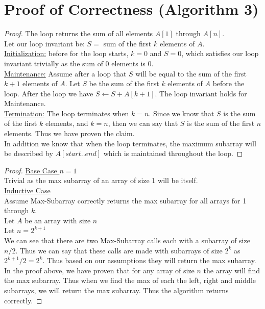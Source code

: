 \documentclass[paper=a4, fontsize=11pt]{scrartcl} %
\numberwithin{equation}{section} %
\numberwithin{figure}{section} %
\numberwithin{table}{section} %
\begin{document}
\section{Proof of Correctness (Algorithm 3)}
\begin{proof}
    The loop returns the sum of all elements $A[1]$ through $A[n]$. \\
    Let our loop invariant be: $S = $ sum of the first $k$ elements of $A$. \\
    \underline{Initialization:} before for the loop starts,
    $k = 0$ and $S = 0$, which satisfies our loop invariant trivially as
    the sum of 0 elements is 0. \\
    \underline{Maintenance:} Assume after a loop that $S$ will be equal to
    the sum of the first $k + 1$ elements of $A$. Let $S$ be the sum of the 
    first $k$ elements of $A$ before the loop. After the loop we have 
    $S \gets S + A[k + 1]$. The loop invariant holds for Maintenance. \\
    \underline{Termination:} The loop terminates when $k = n$. Since we know
    that $S$ is the sum of the first $k$ elements, and $k = n$, then we can 
    say that $S$ is the sum of the first $n$ elements. Thus we have proven the claim. \\
    In addition we know that when the loop terminates, the maximum subarray will
    be described by $A[start..end]$ which is maintained throughout the loop.
\end{proof}
\begin{proof}
    \underline{Base Case $n = 1$} \\
    Trivial as the max subarray of an array of size 1 will be itself. \\
    \underline{Inductive Case} \\
    Assume Max-Subarray correctly returns the max subarray for all arrays
    for 1 through $k$. \\
    Let $A$ be an array with size $n$ \\
    Let $n = 2^{k + 1}$ \\
    We can see that there are two Max-Subarray calls each with a subarray of
    size $n/2$. Thus we can say that these calls are made with subarrays of
    size $2^k$ as $2^{k + 1} / 2 = 2^k$. Thus based on our assumptions they 
    will return the max subarray. \\
    In the proof above, we have proven that for any array of size $n$ the 
    array will find the max subarray. Thus when we find the max of each the left,
    right and middle subarrays, we will return the max subarray. Thus the algorithm
    returns correctly.
\end{proof}
\end{document}
